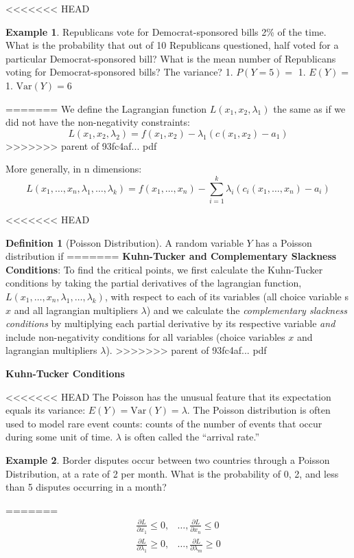 \documentclass[]{book}
\theoremstyle{definition}
\newtheorem{definition}{Definition}[chapter]
\theoremstyle{definition}
\newtheorem{example}{Example}[chapter]
\theoremstyle{definition}
\theoremstyle{remark}
\begin{document}
<<<<<<< HEAD
\begin{example}
\protect\hypertarget{exm:unnamed-chunk-88}{}{\label{exm:unnamed-chunk-88} }Republicans vote for Democrat-sponsored bills 2\% of the time. What is the probability that out of 10 Republicans questioned, half voted for a particular Democrat-sponsored bill? What is the mean number of Republicans voting for Democrat-sponsored bills? The variance?
1. \(P(Y=5)=\)
1. \(E(Y)=\)
1. \(\text{Var}(Y)=6\)
\end{example}
=======
We define the Lagrangian function \(L(x_1,x_2,\lambda_1)\) the same as if we did not have the non-negativity constraints:
\[L(x_1,x_2,\lambda_2) = f(x_1,x_2) - \lambda_1(c(x_1,x_2) - a_1)\]
>>>>>>> parent of 93fc4af... pdf

More generally, in n dimensions:
\[ L(x_1, \dots, x_n, \lambda_1, \dots, \lambda_k) = f(x_1, \dots, x_n) - \sum_{i=1}^k\lambda_i(c_i(x_1,\dots, x_n) - a_i)\]

<<<<<<< HEAD
\begin{definition}[Poisson Distribution]
\protect\hypertarget{def:unnamed-chunk-89}{}{\label{def:unnamed-chunk-89} {} }A random variable \(Y\) has a Poisson distribution if
=======
\textbf{Kuhn-Tucker and Complementary Slackness Conditions}: To find the critical points, we first calculate the Kuhn-Tucker conditions by taking the partial derivatives of the lagrangian function, \(L(x_1,\dots,x_n,\lambda_1,\dots,\lambda_k)\), with respect to each of its variables (all choice variable s\(x\) and all lagrangian multipliers \(\lambda\)) and we calculate the \emph{complementary slackness conditions} by multiplying each partial derivative by its respective variable \emph{and} include non-negativity conditions for all variables (choice variables \(x\) and lagrangian multipliers \(\lambda\)).
>>>>>>> parent of 93fc4af... pdf

\textbf{Kuhn-Tucker Conditions}

<<<<<<< HEAD
The Poisson has the unusual feature that its expectation equals its variance: \(E(Y)=\text{Var}(Y)=\lambda\). The Poisson distribution is often used to model rare event counts: counts of the number of events that occur during some unit of time. \(\lambda\) is often called the ``arrival rate.''
\end{definition}

\begin{example}
\protect\hypertarget{exm:unnamed-chunk-90}{}{\label{exm:unnamed-chunk-90} }Border disputes occur between two countries through a Poisson Distribution, at a rate of 2 per month. What is the probability of 0, 2, and less than 5 disputes occurring in a month?
\end{example}
=======
\begin{align*}
\frac{\partial L}{\partial x_1} \leq 0, & \dots, \frac{\partial L}{\partial x_n} \leq 0\\
\frac{\partial L}{\partial \lambda_1} \geq 0, & \dots, \frac{\partial L}{\partial \lambda_m} \geq 0
\end{align*}
\end{document}
